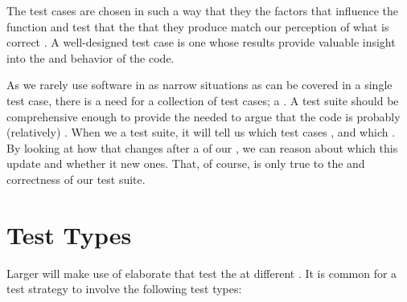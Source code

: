 The test cases are chosen in such a way that they  the factors that influence the function and test that the  that they produce match our perception of what is correct . A well-designed test case is one whose results provide valuable insight into the  and behavior of the code.

As we rarely use software in as narrow situations as can be covered in a single test case, there is a need for a collection of test cases; a . A test suite should be comprehensive enough to provide the  needed to argue that the code is probably (relatively) . When we  a test suite, it will tell us which test cases , and which . By looking at how that changes after a  of our , we can reason about which  this update  and whether it  new ones. That, of course, is only true to the  and correctness of our test suite.

\section{Test Types}

Larger  will make use of elaborate  that test the  at different . It is common for a test strategy to involve the following test types:

